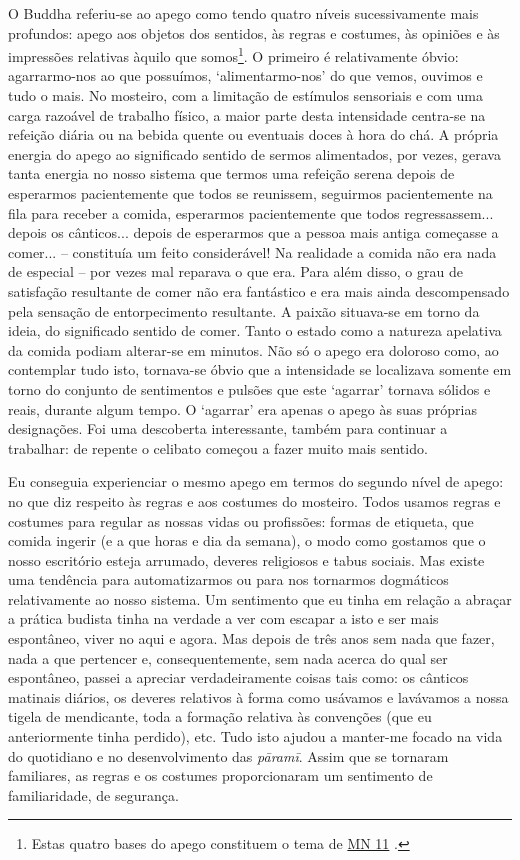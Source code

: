 O Buddha referiu-se ao apego como tendo quatro níveis sucessivamente mais profundos: apego aos objetos dos sentidos, às regras e costumes, às opiniões e às impressões relativas àquilo que somos\footnote{Estas quatro bases do apego constituem o tema de \href{https://suttacentral.net/mn11/en/bodhi}{MN 11} .}. O primeiro é relativamente óbvio: agarrarmo-nos ao que possuímos, `alimentarmo-nos' do que vemos, ouvimos e tudo o mais. No mosteiro, com a limitação de estímulos sensoriais e com uma carga razoável de trabalho físico, a maior parte desta intensidade centra-se na refeição diária ou na bebida quente ou eventuais doces à hora do chá. A própria energia do apego ao significado sentido de sermos alimentados, por vezes, gerava tanta energia no nosso sistema que termos uma refeição serena depois de esperarmos pacientemente que todos se reunissem, seguirmos pacientemente na fila para receber a comida, esperarmos pacientemente que todos regressassem... depois os cânticos... depois de esperarmos que a pessoa mais antiga começasse a comer... -- constituía um feito considerável! Na realidade a comida não era nada de especial -- por vezes mal reparava o que era. Para além disso, o grau de satisfação resultante de comer não era fantástico e era mais ainda descompensado pela sensação de entorpecimento resultante. A paixão situava-se em torno da ideia, do significado sentido de comer. Tanto o estado como a natureza apelativa da comida podiam alterar-se em minutos. Não só o apego era doloroso como, ao contemplar tudo isto, tornava-se óbvio que a intensidade se localizava somente em torno do conjunto de sentimentos e pulsões que este `agarrar' tornava sólidos e reais, durante algum tempo. O `agarrar' era apenas o apego às suas próprias designações. Foi uma descoberta interessante, também para continuar a trabalhar: de repente o celibato começou a fazer muito mais sentido.

Eu conseguia experienciar o mesmo apego em termos do segundo nível de apego: no que diz respeito às regras e aos costumes do mosteiro. Todos usamos regras e costumes para regular as nossas vidas ou profissões: formas de etiqueta, que comida ingerir (e a que horas e dia da semana), o modo como gostamos que o nosso escritório esteja arrumado, deveres religiosos e tabus sociais. Mas existe uma tendência para automatizarmos ou para nos tornarmos dogmáticos relativamente ao nosso sistema. Um sentimento que eu tinha em relação a abraçar a prática budista tinha na verdade a ver com escapar a isto e ser mais espontâneo, viver no aqui e agora. Mas depois de três anos sem nada que fazer, nada a que pertencer e, consequentemente, sem nada acerca do qual ser espontâneo, passei a apreciar verdadeiramente coisas tais como: os cânticos matinais diários, os deveres relativos à forma como usávamos e lavávamos a nossa tigela de mendicante, toda a formação relativa às convenções (que eu anteriormente tinha perdido), etc. Tudo isto ajudou a manter-me focado na vida do quotidiano e no desenvolvimento das \emph{pāramī}. Assim que se tornaram familiares, as regras e os costumes proporcionaram um sentimento de familiaridade, de segurança.

